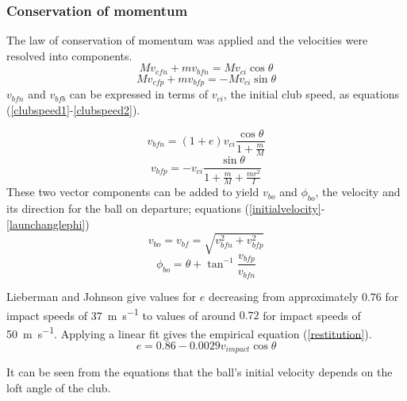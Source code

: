 \documentclass[12pt]{article}
\begin{document}
\subsubsection{Conservation of momentum}
The law of conservation of momentum was applied and the velocities were resolved into components.
\begin{equation} \label{linearmomentum1}
M v_{cfn}+mv_{bfn}=Mv_{ci} \cos{\theta}
\end{equation}
\begin{equation} \label{linearmomentum2}
M v_{cfp}+mv_{bfp}=-Mv_{ci} \sin{\theta}
\end{equation}
$v_{bfn}$ and $v_{bfb}$ can be expressed in terms of $v_{ci}$, the initial club speed, as equations (\ref{clubspeed1}-\ref{clubspeed2}).

\begin{equation} \label{clubspeed1}
v_{bfn}=(1+e)v_{ci} \frac{\cos{\theta}}{1+\frac{m}{M}}
\end{equation}
\begin{equation} \label{clubspeed2}
v_{bfp}=-v_{ci} \frac{\sin{\theta}}{1+\frac{m}{M}+\frac{mr^2}{I}}
\end{equation}
These two vector components can be added to yield $v_{bo}$ and $\phi_{bo}$, the velocity and its direction for the ball on departure; equations (\ref{initialvelocity}-\ref{launchanglephi})\cite{Penner2001}
\begin{equation} \label{initialvelocity}
v_{bo}=v_{bf}=\sqrt{v_{bfn}^2+v_{bfp}^2}
\end{equation}
\begin{equation} \label{launchanglephi}
\phi_{bo}=\theta+\tan^{-1}{\frac{v_{bfp}}{v_{bfn}}}
\end{equation}

Lieberman and Johnson give values for $e$ decreasing from approximately $0.76$ for impact speeds of \SI{37}{\metre\per\second} to values of around $0.72$ for impact speeds of \SI{50}{\metre\per\second}. Applying a linear fit gives the empirical equation (\ref{restitution})\cite{Penner2001}.
\begin{equation} \label{restitution}
e=0.86-0.0029 v_{impact} \cos{\theta}
\end{equation}

It can be seen from the equations that the ball's initial velocity depends on the loft angle of the club.
\end{document}

